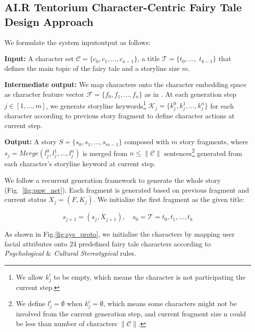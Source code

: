 \subsection{AI.R Tentorium Character-Centric Fairy Tale Design Approach}
We formulate the system input\/output as follows:

\textbf{Input:} A character set $\mathcal{C}=\{c_0,c_1,..., c_{n-1}\}$, a title $\mathcal{T}=\{t_0,...,$ $t_{k-1}\}$ that defines the main topic of the fairy tale and a storyline size $m$.

\textbf{Intermediate output:} We map characters onto the character embedding space as character feature vector $\mathcal{F}=\{f_0,f_1,...,f_n\}$ as in \cite{Liu2020}. At each generation step $j\in[1,...,m]$, we generate storyline keywords\footnote{We allow $k_j^i$ to be empty, which means the character is not participating the current step.} $\mathcal{K}_j=\{k_j^0,k_j^1,...,k_j^n\}$ for each character according to previous story fragment to define character actions at current step.

\textbf{Output:} A story $S=\{s_0,s_1,...,s_{m-1}\}$ composed with $m$ story fragments, where $s_j=Merge(l_j^0,l_j^1,...,l_j^n)$ is merged from $n\leq\|\mathcal{C}\|$ sentences\footnote{We define $l_j^i=\emptyset$ when $k_j^i=\emptyset$, which means some characters might not be involved from the current generation step, and current fragment size n could be less than number of characters $\|\mathcal{C}\|$.} generated from each character’s storyline keyword at current step.

We follow a recurrent generation framework\cite{Yao} to generate the whole story (Fig.~\ref{fig:pnw_net}). Each fragment is generated based on previous fragment and current status $X_j=(F,K_j)$. We initialize the first fragment as the given title:

\begin{equation}
s_{j+1}=(s_j,X_{j+1}),\quad s_0=\mathcal{T}={t_0,t_1,...,t_k}      
\end{equation}

As shown in Fig.\ref{fig:sys_proto}, we initialize the characters by mapping user facial attributes onto 24 predefined fairy tale characters according to \textit{Psychological $\&$ Cultural Stereotypical} rules.
